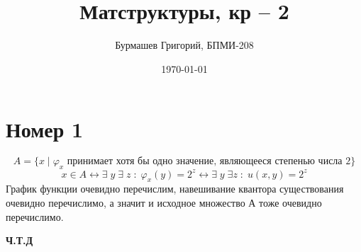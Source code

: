 \documentclass[a4paper,12pt]{article}
\author{Бурмашев Григорий, БПМИ-208}
\title{Матструктуры, кр -- 2}
\date{\today}
\begin{document}
\maketitle
\section*{Номер 1}
\[
A = \{ x \; | \; \varphi_x \text{ принимает хотя бы одно значение, являющееся степенью числа 2}\}
\]
\[
x \in A \leftrightarrow \exists \; y \;  \exists \; z \; : \; \varphi_x(y) = 2^z  \leftrightarrow \exists \; y \; \exists z \; : \;  u(x, y) = 2^z
\]
График функции очевидно перечислим, навешивание квантора существования очевидно перечислимо, а значит и исходное множество А тоже очевидно перечислимо.
\begin{center}
\textbf{Ч.Т.Д} 
\end{center}
\end{document}
